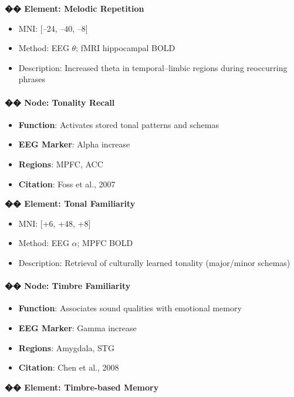 \documentclass[10pt]{article}
\begin{document}
\textbf{�� Element: Melodic Repetition}

\begin{itemize}
    \item MNI: [–24, –40, –8]
    \item Method: EEG $\theta$; fMRI hippocampal BOLD
    \item Description: Increased theta in temporal–limbic regions during reoccurring phrases
\end{itemize}

\paragraph{�� Node: Tonality Recall}

\begin{itemize}
    \item \textbf{Function}: Activates stored tonal patterns and schemas
    \item \textbf{EEG Marker}: Alpha increase
    \item \textbf{Regions}: MPFC, ACC
    \item \textbf{Citation}: Foss et al., 2007
\end{itemize}

\textbf{�� Element: Tonal Familiarity}

\begin{itemize}
    \item MNI: [+6, +48, +8]
    \item Method: EEG $\alpha$; MPFC BOLD
    \item Description: Retrieval of culturally learned tonality (major/minor schemas)
\end{itemize}

\paragraph{�� Node: Timbre Familiarity}

\begin{itemize}
    \item \textbf{Function}: Associates sound qualities with emotional memory
    \item \textbf{EEG Marker}: Gamma increase
    \item \textbf{Regions}: Amygdala, STG
    \item \textbf{Citation}: Chen et al., 2008
\end{itemize}

\textbf{�� Element: Timbre-based Memory}
\end{document}
